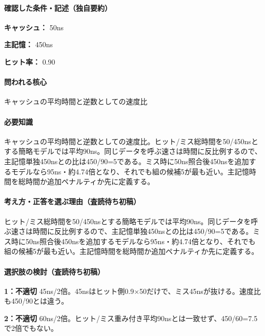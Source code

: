 \paragraph{確認した条件・記述（独自要約）}\mbox{}\par

\noindent\textbf{キャッシュ：} 50ns\par

\noindent\textbf{主記憶：} 450ns\par

\noindent\textbf{ヒット率：} 0.90\par

\paragraph{問われる核心} キャッシュの平均時間と逆数としての速度比

\paragraph{必要知識} キャッシュの平均時間と逆数としての速度比。ヒット/ミス総時間を50/450nsとする簡略モデルでは平均90ns。同じデータを呼ぶ速さは時間に反比例するので、主記憶単独450nsとの比は450/90=\allowbreak{}5である。ミス時に50ns照合後450nsを追加するモデルなら95ns・約4.74倍となり、それでも組の候補5が最も近い。主記憶時間を総時間か追加ペナルティか先に定義する。

\paragraph{考え方・正答を選ぶ理由（査読待ち初稿）} ヒット/ミス総時間を50/450nsとする簡略モデルでは平均90ns。同じデータを呼ぶ速さは時間に反比例するので、主記憶単独450nsとの比は450/90=\allowbreak{}5である。ミス時に50ns照合後450nsを追加するモデルなら95ns・約4.74倍となり、それでも組の候補5が最も近い。主記憶時間を総時間か追加ペナルティか先に定義する。

\paragraph{選択肢の検討（査読待ち初稿）}\mbox{}\par

\noindent\textbf{1：不適切} 45ns/2倍。45nsはヒット側0.9×50だけで、ミス45nsが抜ける。速度比も450/90とは違う。\par

\noindent\textbf{2：不適切} 60ns/2倍。ヒット/ミス重み付き平均90nsとは一致せず、450/60=\allowbreak{}7.5で2倍でもない。\par

